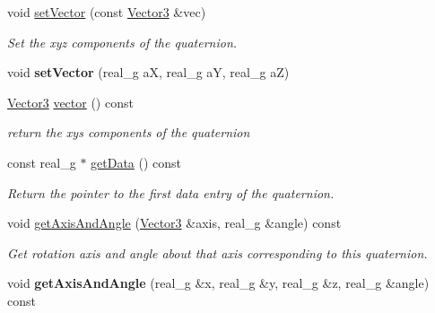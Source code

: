 \begin{Indent}
\begin{DoxyCompactItemize}
\mbox{\label{classrev_1_1_quaternion_a50b9b9102a2601fc06f557cf4a9ce75d}} 
void \mbox{\hyperlink{classrev_1_1_quaternion_a50b9b9102a2601fc06f557cf4a9ce75d}{set\+Vector}} (const \mbox{\hyperlink{classrev_1_1_vector}{Vector3}} \&vec)
\begin{DoxyCompactList}\small\item\em Set the xyz components of the quaternion. \end{DoxyCompactList}\item 
\mbox{\label{classrev_1_1_quaternion_a425c2590f8cb3e29329d53b9563abede}} 
void {\bfseries set\+Vector} (real\+\_\+g aX, real\+\_\+g aY, real\+\_\+g aZ)
\item 
\mbox{\label{classrev_1_1_quaternion_a73919230823ebf8a8c8b9603a10c8dcc}} 
\mbox{\hyperlink{classrev_1_1_vector}{Vector3}} \mbox{\hyperlink{classrev_1_1_quaternion_a73919230823ebf8a8c8b9603a10c8dcc}{vector}} () const
\begin{DoxyCompactList}\small\item\em return the xys components of the quaternion \end{DoxyCompactList}\item 
\mbox{\label{classrev_1_1_quaternion_a59d2e09a0fd9528b41dff56fffae8b70}} 
const real\+\_\+g $\ast$ \mbox{\hyperlink{classrev_1_1_quaternion_a59d2e09a0fd9528b41dff56fffae8b70}{get\+Data}} () const
\begin{DoxyCompactList}\small\item\em Return the pointer to the first data entry of the quaternion. \end{DoxyCompactList}\item 
void \mbox{\hyperlink{classrev_1_1_quaternion_a8c429750f9460c64f220ff6876beb818}{get\+Axis\+And\+Angle}} (\mbox{\hyperlink{classrev_1_1_vector}{Vector3}} \&axis, real\+\_\+g \&angle) const
\begin{DoxyCompactList}\small\item\em Get rotation axis and angle about that axis corresponding to this quaternion. \end{DoxyCompactList}\item 
\mbox{\label{classrev_1_1_quaternion_a3f6f61e364f58e30f220db8b63235547}} 
void {\bfseries get\+Axis\+And\+Angle} (real\+\_\+g \&x, real\+\_\+g \&y, real\+\_\+g \&z, real\+\_\+g \&angle) const

\end{DoxyCompactItemize}
\end{Indent}
